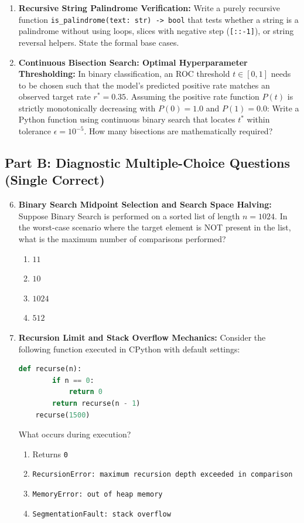\begin{enumerate}
    \item \textbf{Recursive String Palindrome Verification:}
    Write a purely recursive function \texttt{is\_palindrome(text: str) -> bool} that tests whether a string is a palindrome without using loops, slices with negative step (\texttt{[::-1]}), or string reversal helpers. State the formal base cases.

    \item \textbf{Continuous Bisection Search: Optimal Hyperparameter Thresholding:}
    In binary classification, an ROC threshold $t \in [0, 1]$ needs to be chosen such that the model's predicted positive rate matches an observed target rate $r^* = 0.35$.
    Assuming the positive rate function $P(t)$ is strictly monotonically decreasing with $P(0) = 1.0$ and $P(1) = 0.0$:
    Write a Python function using continuous binary search that locates $t^*$ within tolerance $\epsilon = 10^{-5}$. How many bisections are mathematically required?
\end{enumerate}

\subsection*{Part B: Diagnostic Multiple-Choice Questions (Single Correct)}

\begin{enumerate}
    \setcounter{enumi}{5}
    \item \textbf{Binary Search Midpoint Selection and Search Space Halving:}
    Suppose Binary Search is performed on a sorted list of length $n = 1024$. In the worst-case scenario where the target element is NOT present in the list, what is the maximum number of comparisons performed?
    \begin{enumerate}
        \item $11$
        \item $10$
        \item $1024$
        \item $512$
    \end{enumerate}

    \item \textbf{Recursion Limit and Stack Overflow Mechanics:}
    Consider the following function executed in CPython with default settings:
    \begin{lstlisting}[language=Python]
    def recurse(n):
        if n == 0:
            return 0
        return recurse(n - 1)
    recurse(1500)
    \end{lstlisting}
    What occurs during execution?
    \begin{enumerate}
        \item Returns \texttt{0}
        \item \texttt{RecursionError: maximum recursion depth exceeded in comparison}
        \item \texttt{MemoryError: out of heap memory}
        \item \texttt{SegmentationFault: stack overflow}
    \end{enumerate}
\end{enumerate}
